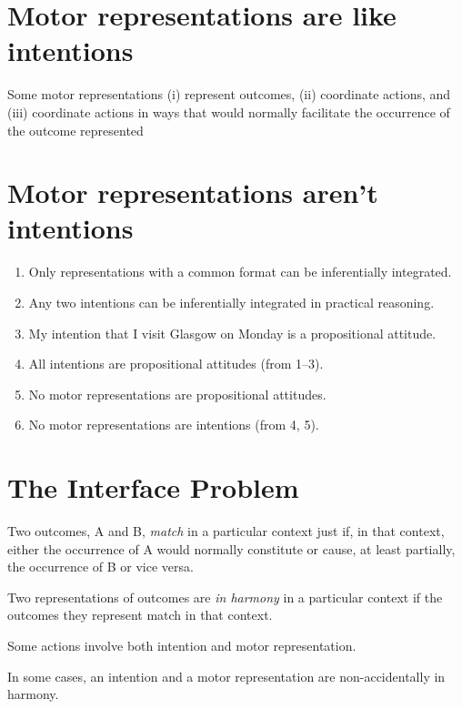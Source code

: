 \documentclass[11pt]{extarticle}
\begin{document}
\begin{multicols}{3}
\section{Motor representations are like intentions}
Some motor representations (i) represent outcomes, (ii) coordinate actions, and (iii) coordinate actions in ways that would normally facilitate the occurrence of the outcome represented \citep[cf][]{pacherie:2008_action}


\section{Motor representations aren't intentions}
\begin{enumerate}
\item Only representations with a common format can be inferentially integrated.

\item Any two intentions can be inferentially integrated in practical reasoning.

\item My intention that I visit Glasgow on Monday is a propositional attitude.

\item All intentions are propositional attitudes (from 1--3).

\item No motor representations are propositional attitudes.

\item No motor representations are intentions (from 4, 5).
\end{enumerate}





\section{The Interface Problem}
Two  outcomes, A and B, \emph{match} in a particular context just if, in that context, either the occurrence of A would normally constitute or cause, at least partially, the occurrence of B or vice versa. 

Two representations of outcomes are \emph{in harmony} in a particular context if the outcomes they represent match in that context.

Some actions involve both  intention and motor representation.

In some cases, an intention and a motor representation are non-accidentally in harmony.


\end{multicols}
\end{document}
